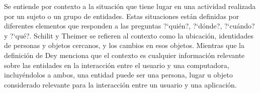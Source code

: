 Se entiende por contexto a la situaci\'on que tiene lugar en una actividad realizada por un sujeto o un grupo de entidades. Estas situaciones est\'an definidas por diferentes elementos que responden a las preguntas ?`qui\'en?, ?`d\'onde?, ?`cu\'ando? y ?`qu\'e?. Schilit y Theimer \cite{schillit1994disseminating} se refieren al contexto como la ubicaci\'on, identidades de personas y objetos cercanos, y los cambios en esos objetos. Mientras que la definici\'on de Dey \cite{dey2001conceptual} menciona que el contexto es cualquier informaci\'on relevante sobre las entidades en la interacci\'on entre el usuario y una computadora, incluy\'endolos a ambos, una entidad puede ser una persona, lugar u objeto considerado relevante para la interacci\'on entre un usuario y una aplicaci\'on.
